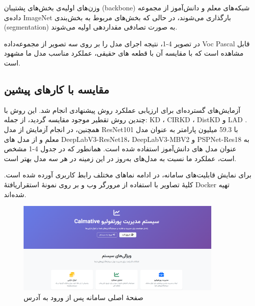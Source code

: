 وزن‌های اولیه‌ی بخش‌های پشتیبان (backbone) شبکه‌های معلم و دانش‌آموز از مجموعه داده‌ی ImageNet بارگذاری می‌شوند، در حالی که بخش‌های مربوط به بخش‌بندی (segmentation) به صورت تصادفی مقداردهی اولیه می‌شوند.



در تصویر 4-1، نتیجه اجرای مدل را بر روی سه تصویر از مجموعه‌داده Voc Pascal قابل مشاهده است که با مقایسه آن با قطعه های حقیقی، عملکرد مناسب مدل ما مشهود است.



\subsection{مقایسه با کار‌های پیشین}

آزمایش‌های گسترده‌ای برای ارزیابی عملکرد روش پیشنهادی انجام شد. این روش با چندین روش تقطیر موجود مقایسه گردید، از جمله: KD \cite{hinton2015distillingknowledgeneuralnetwork}، CIRKD \cite{yang2022crossimagerelationalknowledgedistillation}، DistKD \cite{huang2022knowledgedistillationstrongerteacher} و LAD \cite{Liu2024RethinkingKD}. همچنین، در انجام آزمایش از مدل ResNet101 با 59.3 میلیون پارامتر به عنوان مدل معلم و از مدل های DeepLabV3-ResNet18، DeepLabV3-MBV2 و PSPNet-Res18 به عنوان مدل های دانش‌آموز استفاده شده است.
همانطور که در جدول 4-1 مشخص است، عملکرد ما نسبت به مدل‌های به‌روز در این زمینه در هر سه مدل بهتر است.
‫‫



برای نمایش قابلیت‌های سامانه، در ادامه نماهای مختلف رابط کاربری آورده شده است. کلیهٔ تصاویر با استفاده از مرورگر وب و بر روی نمونهٔ استقراریافتهٔ Docker تهیه شده‌اند.

\begin{figure}[H]
\centering
\includegraphics[width=0.9\textwidth]{../figures/1.صفحه اصلی.png}
\caption{صفحهٔ اصلی سامانه پس از ورود به آدرس }
\end{figure}

